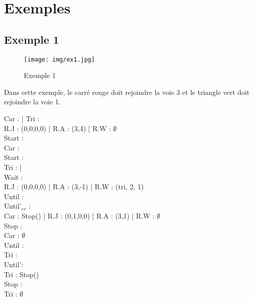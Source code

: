 \documentclass[12pt]{article}
\begin{document}

\newpage
\section{Exemples}
\subsection{Exemple 1}
\begin{figure}[h]
    \centering
    \texttt{[image: img/ex1.jpg]}
    \caption{Exemple 1}
    \label{fig:exemple1}
\end{figure}
Dans cette exemple, le carré rouge doit rejoindre la voie 3 et le triangle vert doit rejoindre la voie 1.
\vspace{0.5cm}

Car :  |
Tri :  \\
R.J : (0,0,0,0) | R.A : (3,4) | R.W : $\emptyset$
\\ Start :  
\vspace{0.5cm} \\
Car :  
\\ Start :  
\vspace{0.5cm}\\
Tri :  |
\\ Wait :  
\vspace{0.5cm}\\
R.J : (0,0,0,0) | R.A : (3,-1) | R.W : (tri, 2, 1)
\\ Until : 
\vspace{0.5cm}\\
 Until'$_{ev}$ : 
\vspace{0.5cm}\\
Car : Stop() |
R.J : (0,1,0,0) | R.A : (3,1) | R.W : $\emptyset$
\\ Stop : 
\vspace{0.5cm}\\
Car : $\emptyset$
\\ Until : 
\vspace{0.5cm}\\
Tri : 
\\Until': 
\vspace{0.5cm}\\
Tri : Stop()
\\ Stop : 
\vspace{0.5cm}\\
Tri : $\emptyset$
\end{document}
